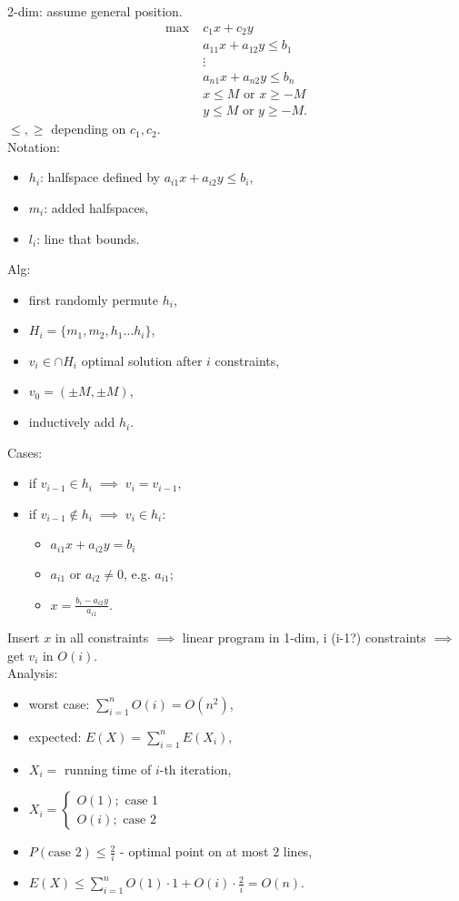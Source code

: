 \documentclass[a4paper, 12pt]{book}
\theoremstyle{definition}
\theoremstyle{remark}
\begin{document}
2-dim: assume general position.
\begin{align*}
  \max \; &c_1 x + c_2 y \\
  &a_{11} x + a_{12} y \leq b_1 \\
  &\vdots \\
  &a_{n1} x + a_{n2} y \leq b_n \\
  &x \leq M \text{ or } x \geq -M \\
  &y \leq M \text{ or } y \geq -M.
\end{align*}
$\leq, \geq$ depending on $c_1, c_2$. \\
Notation:
\begin{itemize}[label={}]
  \item $h_i$: halfspace defined by $a_{i1} x + a_{i2} y \leq b_i$,
  \item $m_i$: added halfspaces,
  \item $l_i$: line that bounds.
\end{itemize}
Alg:
\begin{itemize}
  \item first randomly permute $h_i$,
  \item $H_i = \{m_1, m_2, h_1 \dots h_i\}$,
  \item $v_i \in \cap H_i$ optimal solution after $i$ constraints,
  \item $v_0 = (\pm M, \pm M)$,
  \item inductively add $h_i$.
\end{itemize}
Cases:
\begin{itemize}[label={}]
  \item if $v_{i-1} \in h_i \; \implies \; v_i = v_{i-1}$,
  \item if $v_{i-1} \notin h_i \; \implies \; v_i \in h_i$:
    \begin{itemize}[label={}]
      \item $a_{i1} x + a_{i2} y = b_i$
      \item $a_{i1}$ or $a_{i2} \neq 0$, e.g. $a_{i1}$;
      \item $x = \frac{b_i - a_{i2} y}{a_{i1}}$.
    \end{itemize}
\end{itemize}
Insert $x$ in all constraints $\implies$ linear program in 1-dim, i (i-1?) constraints
$\implies$ get $v_i$ in $O(i)$. \\
Analysis:
\begin{itemize}
  \item worst case: $\sum_{i=1}^{n} O(i) = O(n^2)$,
  \item expected: $E(X) = \sum_{i=1}^{n} E(X_i)$,
  \item $X_i =$ running time of $i$-th iteration,
  \item $X_i = \begin{cases}O(1); \text{ case 1} \\ O(i); \text{ case 2}\end{cases}$
  \item $P(\text{case 2}) \leq \frac{2}{i}$ - optimal point on at most $2$ lines,
  \item $E(X) \leq \sum_{i=1}^{n} O(1) \cdot 1 + O(i) \cdot \frac{2}{i} = O(n)$.
\end{itemize}
\end{document}
